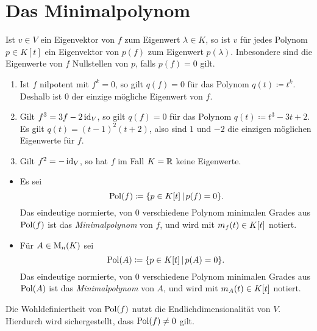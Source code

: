 \section{Das Minimalpolynom}

\begin{lemma}
  \label{lemma: polynomial equations give restriction for the eigenvalues}
  Ist $v \in V$ ein Eigenvektor von $f$ zum Eigenwert $\lambda \in K$, so ist $v$ für jedes Polynom $p \in K[t]$ ein Eigenvektor von $p(f)$ zum Eigenwert $p(\lambda)$.
  Inbesondere sind die Eigenwerte von $f$ Nullstellen von $p$, falls $p(f) = 0$ gilt.
\end{lemma}

\begin{example}
  \begin{enumerate}
    \item
      Ist $f$ nilpotent mit $f^k = 0$, so gilt $q(f) = 0$ für das Polynom $q(t) \coloneqq t^k$.
      Deshalb ist $0$ der einzige mögliche Eigenwert von $f$.
    \item
      Gilt $f^3 = 3f - 2 \operatorname{id}_V$, so gilt $q(f) = 0$ für das Polynom $q(t) \coloneqq t^3 - 3t + 2$.
      Es gilt $q(t) = (t-1)^2 (t+2)$, also sind $1$ und $-2$ die einzigen möglichen Eigenwerte für $f$.
    \item
      Gilt $f^2 = -\operatorname{id}_V$, so hat $f$ im Fall $K = \mathbb{R}$ keine Eigenwerte.
  \end{enumerate}
\end{example}

\begin{definition}
  \begin{itemize}
    \item
      Es sei
      \[
                  \operatorname{Pol}(f)
        \coloneqq \{ p \in K[t] \,|\, p(f) = 0 \}.
      \]
      Das eindeutige normierte, von $0$ verschiedene Polynom minimalen Grades aus $\operatorname{Pol}(f)$ ist das \emph{Minimalpolynom} von $f$, und wird mit $m_{f}(t) \in K[t]$ notiert.
    \item
      Für $A \in \operatorname{M}_{n}(K)$ sei
      \[
                  \operatorname{Pol}(A)
        \coloneqq \{ p \in K[t] \,|\, p(A) = 0 \}.
      \]
      Das eindeutige normierte, von $0$ verschiedene Polynom minimalen Grades aus $\operatorname{Pol}(A)$ ist das \emph{Minimalpolynom} von $A$, und wird mit $m_{A}(t) \in K[t]$ notiert.
  \end{itemize}
\end{definition}

\begin{remark}
  Die Wohldefiniertheit von $\operatorname{Pol}(f)$ nutzt die Endlichdimensionalität von $V$.
  Hierdurch wird sichergestellt, dass $\operatorname{Pol}(f) \neq 0$ gilt.
\end{remark}

